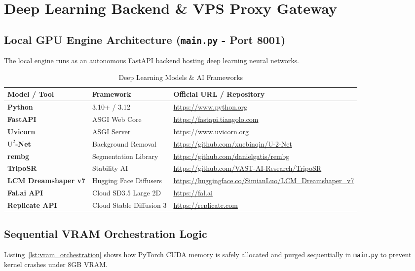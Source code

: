 \documentclass[11pt, a4paper]{article}
\begin{document}
\section{Deep Learning Backend \& VPS Proxy Gateway}

\subsection{Local GPU Engine Architecture (\texttt{main.py} - Port 8001)}
The local engine runs as an autonomous FastAPI backend hosting deep learning neural networks.

\begin{table}[H]
\centering
\caption{Deep Learning Models \& AI Frameworks}
\label{tab:tools_ch5}
\begin{tabularx}{\textwidth}{l l X}
\toprule
\textbf{Model / Tool} & \textbf{Framework} & \textbf{Official URL / Repository} \\
\midrule
\textbf{Python} & 3.10+ / 3.12 & \url{https://www.python.org} \\
\textbf{FastAPI} & ASGI Web Core & \url{https://fastapi.tiangolo.com} \\
\textbf{Uvicorn} & ASGI Server & \url{https://www.uvicorn.org} \\
\textbf{$\text{U}^2$-Net} & Background Removal & \url{https://github.com/xuebinqin/U-2-Net} \\
\textbf{rembg} & Segmentation Library & \url{https://github.com/danielgatis/rembg} \\
\textbf{TripoSR} & Stability AI & \url{https://github.com/VAST-AI-Research/TripoSR} \\
\textbf{LCM Dreamshaper v7} & Hugging Face Diffusers & \url{https://huggingface.co/SimianLuo/LCM_Dreamshaper_v7} \\
\textbf{Fal.ai API} & Cloud SD3.5 Large 2D & \url{https://fal.ai} \\
\textbf{Replicate API} & Cloud Stable Diffusion 3 & \url{https://replicate.com} \\
\bottomrule
\end{tabularx}
\end{table}

\subsection{Sequential VRAM Orchestration Logic}
Listing~\ref{lst:vram_orchestration} shows how PyTorch CUDA memory is safely allocated and purged sequentially in \texttt{main.py} to prevent kernel crashes under 8GB VRAM.
\end{document}
